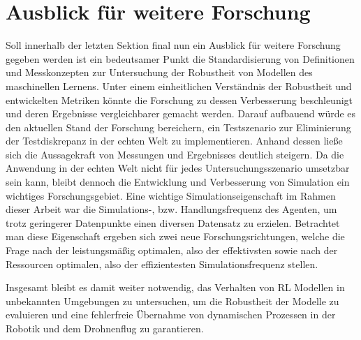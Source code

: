\section{Ausblick für weitere Forschung}

Soll innerhalb der letzten Sektion final nun ein Ausblick für weitere Forschung gegeben werden ist ein bedeutsamer Punkt die Standardisierung von Definitionen und Messkonzepten zur Untersuchung der Robustheit von Modellen des maschinellen Lernens.
Unter einem einheitlichen Verständnis der Robustheit und entwickelten Metriken könnte die Forschung zu dessen Verbesserung beschleunigt und deren Ergebnisse vergleichbarer gemacht werden.
Darauf aufbauend würde es den aktuellen Stand der Forschung bereichern, ein Testszenario zur Eliminierung der Testdiskrepanz in der echten Welt zu implementieren. 
Anhand dessen ließe sich die Aussagekraft von Messungen und Ergebnisses deutlich steigern.
Da die Anwendung in der echten Welt nicht für jedes Untersuchungsszenario umsetzbar sein kann, bleibt dennoch die Entwicklung und Verbesserung von Simulation ein wichtiges Forschungsgebiet.
Eine wichtige Simulationseigenschaft im Rahmen dieser Arbeit war die Simulations-, bzw. Handlungsfrequenz des Agenten, um trotz geringerer Datenpunkte einen diversen Datensatz zu erzielen.
Betrachtet man diese Eigenschaft ergeben sich zwei neue Forschungsrichtungen, welche die Frage nach der leistungsmäßig optimalen, also der effektivsten sowie nach der Ressourcen optimalen, also der effizientesten Simulationsfrequenz stellen.

Insgesamt bleibt es damit weiter notwendig, das Verhalten von RL Modellen in unbekannten Umgebungen zu untersuchen, um die Robustheit der Modelle zu evaluieren und eine fehlerfreie Übernahme von dynamischen Prozessen in der Robotik und dem Drohnenflug zu garantieren.